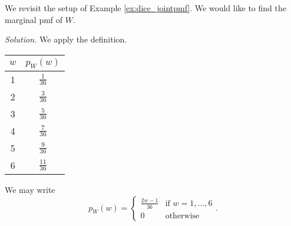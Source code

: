 \begin{example}[]\label{ex:dice_marginalpmf}
	We revisit the setup of Example \ref{ex:dice_jointpmf}. We would like to find the marginal pmf of $W$.

	\textit{Solution.} We apply the definition.
	\begin{center}
	\begin{tabular}{c | c}
		$w$ & $p_W(w)$\\ \hline
		1 & $\frac{1}{36}$\\
		2 & $\frac{3}{36}$\\
		3 & $\frac{5}{36}$\\
		4 & $\frac{7}{36}$\\
		5 & $\frac{9}{36}$\\
		6 & $\frac{11}{36}$
	\end{tabular}
	\end{center}

	We may write $$p_W(w)=\begin{cases}
		\frac{2w-1}{36} & \text{if $w=1,\hdots, 6$}\\
		0 & \text{otherwise}
	\end{cases}.$$
\end{example}



